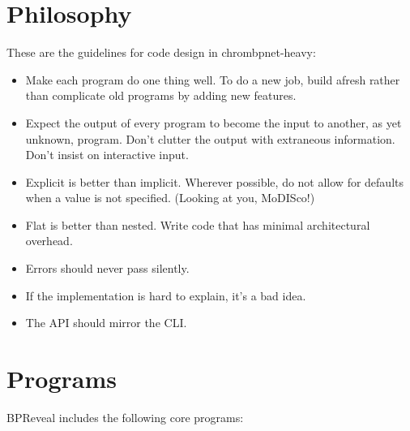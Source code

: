 \documentclass{article}
\begin{document}
\section{Philosophy}

These are the guidelines for code design in chrombpnet-heavy:

\begin{itemize}
    \item Make each program do one thing well. To do a new job, build afresh rather than complicate old programs by adding new features.
    \item Expect the output of every program to become the input to another, as yet unknown, program. Don't clutter the output with extraneous information. Don't insist on interactive input. 
    \item Explicit is better than implicit. Wherever possible, do not allow for defaults when a value is not specified.  (Looking at you, MoDISco!)
    \item Flat is better than nested. Write code that has minimal architectural overhead. 
    \item Errors should never pass silently.
    \item If the implementation is hard to explain, it's a bad idea.
    \item The API should mirror the CLI. 
\end{itemize}


\section{Programs}

BPReveal includes the following core programs:
\end{document}
